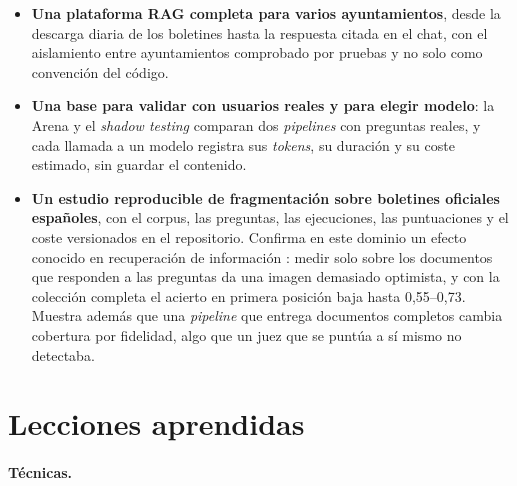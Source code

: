 \begin{itemize}
  \item \textbf{Una plataforma RAG completa para varios ayuntamientos}, desde la descarga diaria de los boletines hasta la respuesta citada en el chat, con el aislamiento entre ayuntamientos comprobado por pruebas y no solo como convención del código.
  \item \textbf{Una base para validar con usuarios reales y para elegir modelo}: la Arena y el \emph{shadow testing} comparan dos \emph{pipelines} con preguntas reales, y cada llamada a un modelo registra sus \emph{tokens}, su duración y su coste estimado, sin guardar el contenido.
  \item \textbf{Un estudio reproducible de fragmentación sobre boletines oficiales españoles}, con el corpus, las preguntas, las ejecuciones, las puntuaciones y el coste versionados en el repositorio. Confirma en este dominio un efecto conocido en recuperación de información \cite{hawking2003}: medir solo sobre los documentos que responden a las preguntas da una imagen demasiado optimista, y con la colección completa el acierto en primera posición baja hasta 0,55--0,73. Muestra además que una \emph{pipeline} que entrega documentos completos cambia cobertura por fidelidad, algo que un juez que se puntúa a sí mismo no detectaba.
\end{itemize}

\section{Lecciones aprendidas}
\label{sec:lecciones}

\paragraph{Técnicas.}

